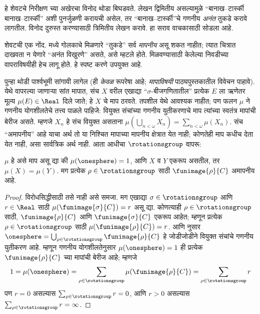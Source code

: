 \documentclass[../../../include/open-logic-section]{subfiles}
\begin{document}
हे शेवटचे निरीक्षण  च्या अखेरचा विनोद थोडा बिघडवते. लेखन द्विमितीय असल्यामुळे “बानाख--टार्स्की बानाख--टार्स्की” अशी पुनर्जुळणी करायची असेल, तर “बानाख--टार्स्की”चे गणनीय \emph{अनंत} तुकडे करावे लागतील. विनोद दुरुस्त करण्यासाठी त्रिमितीय लेखन करावे. हा सराव वाचकासाठी सोडला आहे.

शेवटची एक नोंद.  मध्ये गोलकाचे मिळणारे “तुकडे” सर्व \emph{मापनीय} असू शकत नाहीत; त्यात चित्रात दाखवता न येणारे “अनंत विखुरणे” असते, असे म्हटले होते.  मिळवण्यासाठी केलेल्या निवडीच्या वापराविषयीही हेच लागू होते. हे स्पष्ट करणे उपयुक्त आहे.

पुन्हा थोडी पार्श्वभूमी सांगावी लागेल (ही \emph{केवळ} रूपरेषा आहे; \emph{मापाविषयी} पाठ्यपुस्तकातील विवेचन पाहावे). येथे वापरल्या जाणाऱ्या सांत मापात, संच $X$ वरील एखाद्या “$\sigma$-बीजगणितातील” प्रत्येक $E$ ला ऋणेतर मूल्य $\mu(E) \in
\Real$ दिले जाते; हे $X$ चे माप ठरवते. तपशील येथे आवश्यक नाहीत; पण फलन $\mu$ ने गणनीय योगशीलतेचे तत्त्व पाळले पाहिजे: वियुक्त संचांच्या गणनीय युतीकरणाचे माप त्यांच्या स्वतंत्र मापांची बेरीज असते. म्हणजे $X_n$ हे संच वियुक्त असताना $\mu(\bigcup_{n < \omega} X_n) = \sum_{n < \omega}\mu(X_n)$.
संच “अमापनीय” आहे याचा अर्थ तो या निश्चित मापाच्या मापनीय क्षेत्रात येत नाही; कोणतेही माप कधीच देता येत नाही, असा सार्वत्रिक अर्थ नाही. आता आधीचा $\rotationsgroup$ वापरू:

\begin{cor}[विताली]
$\mu$ हे असे माप असू द्या की $\mu(\onesphere) = 1$, आणि $X$ व $Y$ एकरूप असतील, तर $\mu(X) = \mu(Y)$. मग प्रत्येक $\rho \in
\rotationsgroup$ साठी $\funimage{\rho}{C}$ अमापनीय आहे.
\end{cor}

\begin{proof}
विरोधसिद्धीसाठी तसे नाही असे समजा. मग एखाद्या $\sigma \in \rotationsgroup$ आणि $r \in \Real$ साठी $\mu(\funimage{\sigma}{C}) =
r$ असू द्या. कोणत्याही $\rho \in \rotationsgroup$ साठी, $\funimage{\rho}{C}$ आणि $\funimage{\sigma}{C}$ एकरूप आहेत; म्हणून प्रत्येक $\rho \in \rotationsgroup$ साठी $\mu(\funimage{\rho}{C}) = r$.
 आणि  नुसार $\onesphere =
\bigcup_{\rho \in \rotationsgroup}\funimage{\rho}{C}$ हे जोडीजोडीने वियुक्त संचांचे गणनीय युतीकरण आहे. म्हणून गणनीय योगशीलतेनुसार $\mu(\onesphere) = 1$ ही प्रत्येक $\funimage{\rho}{C}$ च्या मापांची बेरीज आहे; म्हणजे
\[
	1 = \mu(\onesphere) = \sum_{\rho \in \rotationsgroup}\mu(\funimage{\rho}{C}) = \sum_{\rho \in \rotationsgroup}r
\]
पण $r = 0$ असल्यास $\sum_{\rho \in \rotationsgroup}r = 0$, आणि $r
> 0$ असल्यास $\sum_{\rho \in \rotationsgroup}r = \infty$.
\end{proof}
\end{document}
